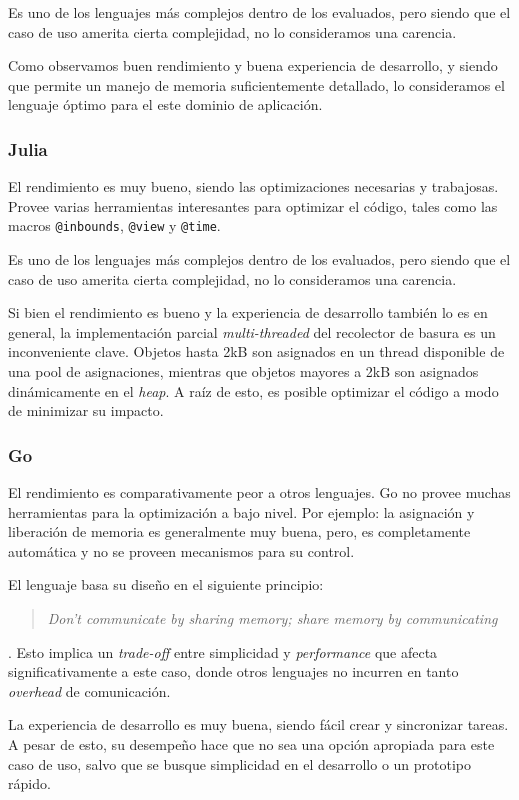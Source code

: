 \documentclass[11pt]{article}
\let\Oldsubsubsection\subsubsection
\renewcommand{\subsubsection}{\FloatBarrier\Oldsubsubsection}
\newcommand{\english}[1]{\textit{#1}}
\begin{document}
Es uno de los lenguajes más complejos dentro de los evaluados, pero siendo que el caso de uso amerita cierta complejidad, no lo consideramos una carencia.

Como observamos buen rendimiento y buena experiencia de desarrollo, y siendo que permite un manejo de memoria suficientemente detallado, lo consideramos el lenguaje óptimo para el este dominio de aplicación.

\subsubsection{Julia}

El rendimiento es muy bueno, siendo las optimizaciones necesarias y trabajosas. Provee varias herramientas interesantes para optimizar el código, tales como las macros \lstinline{@inbounds}, \lstinline{@view} y \lstinline{@time}.

Es uno de los lenguajes más complejos dentro de los evaluados, pero siendo que el caso de uso amerita cierta complejidad, no lo consideramos una carencia.

Si bien el rendimiento es bueno y la experiencia de desarrollo también lo es en general, la implementación parcial \english{multi-threaded} del recolector de basura es un inconveniente clave. Objetos hasta 2kB son asignados en un thread disponible de una pool de asignaciones, mientras que objetos mayores a 2kB son asignados dinámicamente en el \english{heap}. A raíz de esto, es posible optimizar el código a modo de minimizar su impacto.

\subsubsection{Go}

El rendimiento es comparativamente peor a otros lenguajes. Go no provee muchas herramientas para la optimización a bajo nivel. Por ejemplo: la asignación y liberación de memoria es generalmente muy buena, pero, es completamente automática y no se proveen mecanismos para su control.

El lenguaje basa su diseño en el siguiente principio: \blockquote[\cite{go:ex:effective_concurrency}]{\english{Don't communicate by sharing memory; share memory by communicating}} . Esto implica un \english{trade-off} entre simplicidad y \english{performance} que afecta significativamente a este caso, donde otros lenguajes no incurren en tanto \english{overhead} de comunicación.

La experiencia de desarrollo es muy buena, siendo fácil crear y sincronizar tareas. A pesar de esto, su desempeño hace que no sea una opción apropiada para este caso de uso, salvo que se busque simplicidad en el desarrollo o un prototipo rápido.
\end{document}

